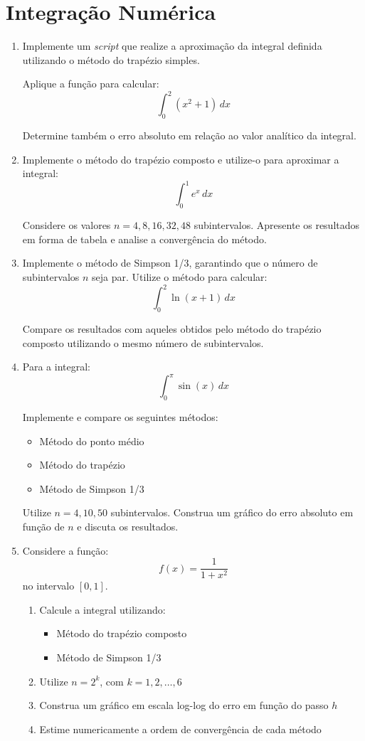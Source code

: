 \clearpage
\section{Integração Numérica}\label{sec:integração}

\begin{enumerate}[label=\thesection.\arabic*]
\item Implemente um \textit{script} que realize a aproximação da integral definida utilizando o método do trapézio simples.

Aplique a função para calcular:
\[
\int_{0}^{2} (x^2 + 1)\,dx
\]

Determine também o erro absoluto em relação ao valor analítico da integral.

\item Implemente o método do trapézio composto e utilize-o para aproximar a integral:
\[
\int_{0}^{1} e^x \, dx
\]

Considere os valores $n = 4, 8, 16, 32, 48$ subintervalos. Apresente os resultados em forma de tabela e analise a convergência do método.
%
\item Implemente o método de Simpson 1/3, garantindo que o número de subintervalos $n$ seja par. Utilize o método para calcular:
\[
\int_{0}^{2} \ln(x+1)\,dx
\]

Compare os resultados com aqueles obtidos pelo método do trapézio composto utilizando o mesmo número de subintervalos.

\item Para a integral:
\[
\int_{0}^{\pi} \sin(x)\,dx
\]

Implemente e compare os seguintes métodos:
\begin{itemize}
    \item Método do ponto médio
    \item Método do trapézio
    \item Método de Simpson 1/3
\end{itemize}

Utilize $n = 4, 10, 50$ subintervalos. Construa um gráfico do erro absoluto em função de $n$ e discuta os resultados.

\item Considere a função:
\[
f(x) = \frac{1}{1 + x^2}
\]
no intervalo $[0,1]$.

\begin{enumerate}
    \item Calcule a integral utilizando:
    \begin{itemize}
        \item Método do trapézio composto
        \item Método de Simpson 1/3
    \end{itemize}
    \item Utilize $n = 2^k$, com $k = 1, 2, \dots, 6$
    \item Construa um gráfico em escala log-log do erro em função do passo $h$
    \item Estime numericamente a ordem de convergência de cada método
\end{enumerate}

\end{enumerate}

